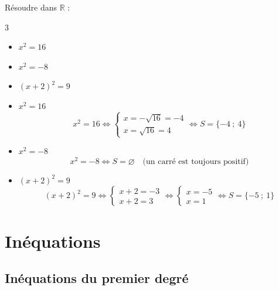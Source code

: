 \begin{methode}[Résoudre une équation de la forme $x^2 = a$]
	Résoudre dans $\mathbb{R}$ :
	\begin{multicols}{3}
		\begin{itemize}
			\item $x^2 = 16$
			\item $x^2 = -8$
			\item $(x + 2)^2 = 9$
		\end{itemize}
	\end{multicols}

	\begin{correction}
		\nline
		\begin{itemize}
			\item $x^2 = 16$
			      \[
				      x^2 = 16
				      \iff \begin{cases}
					      x = -\sqrt{16} = -4 \\
					      x = \sqrt{16} = 4
				      \end{cases}
				      \iff S
				      = \{-4\ ;\ 4\}
			      \]

			\item $x^2 = -8$
			      \[
				      x^2 = -8 \iff S = \varnothing \quad \text{(un carré est toujours positif)}
			      \]

			\item $(x + 2)^2 = 9$
			      \[
				      (x + 2)^2 = 9
				      \iff \begin{cases}
					      x + 2 = -3 \\
					      x + 2 = 3
				      \end{cases}
				      \iff \begin{cases}
					      x = -5 \\
					      x = 1
				      \end{cases}
				      \iff S
				      = \{-5\ ;\ 1\}
			      \]
		\end{itemize}
	\end{correction}
\end{methode}

\section{Inéquations}

\subsection{Inéquations du premier degré}

